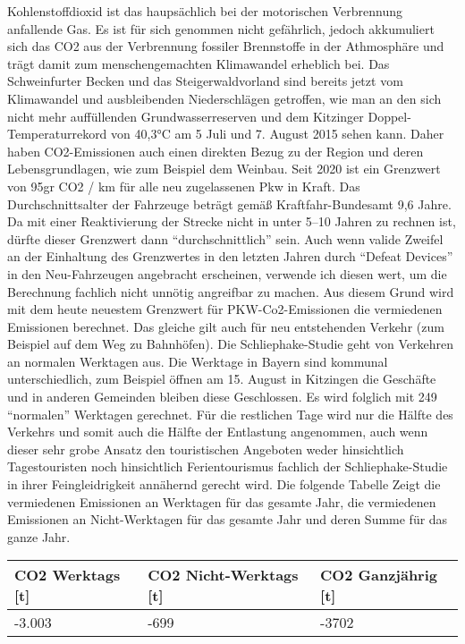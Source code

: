 \documentclass[fontsize=12pt,a4paper]{scrreprt}
\begin{document}
Kohlenstoffdioxid ist das haupsächlich bei der motorischen Verbrennung anfallende Gas. Es ist für sich genommen nicht gefährlich, jedoch akkumuliert sich das CO2 aus der Verbrennung fossiler Brennstoffe in der Athmosphäre und trägt damit zum menschengemachten Klimawandel erheblich bei.
Das Schweinfurter Becken und das Steigerwaldvorland sind bereits jetzt vom Klimawandel und ausbleibenden Niederschlägen getroffen, wie man an den sich nicht mehr auffüllenden Grundwasserreserven und dem Kitzinger Doppel-Temperaturrekord von 40,3°C am 5 Juli und 7. August 2015 sehen kann.
Daher haben CO2-Emissionen auch einen direkten Bezug zu der Region und deren Lebensgrundlagen, wie zum Beispiel dem Weinbau.
\newline
\newline
Seit 2020 ist ein Grenzwert von 95gr CO2 / km für alle neu zugelassenen Pkw in Kraft. Das Durchschnittsalter der Fahrzeuge beträgt gemäß Kraftfahr-Bundesamt 9,6 Jahre. Da mit einer Reaktivierung der Strecke nicht in unter 5--10 Jahren zu rechnen ist, dürfte dieser Grenzwert dann \enquote{durchschnittlich} sein. Auch wenn valide Zweifel an der Einhaltung des Grenzwertes in den letzten Jahren durch \enquote{Defeat Devices} in den Neu-Fahrzeugen angebracht erscheinen, verwende ich diesen wert, um die Berechnung fachlich nicht unnötig angreifbar zu machen.
Aus diesem Grund wird mit dem heute neuestem Grenzwert für PKW-Co2-Emissionen die vermiedenen Emissionen berechnet. Das gleiche gilt auch für neu entstehenden Verkehr (zum Beispiel auf dem Weg zu Bahnhöfen).
\newline
\newline
Die Schliephake-Studie geht von Verkehren an normalen Werktagen aus. Die Werktage in Bayern sind kommunal unterschiedlich, zum Beispiel öffnen am 15. August in Kitzingen die Geschäfte und in anderen Gemeinden bleiben diese Geschlossen. Es wird folglich mit 249 \enquote{normalen} Werktagen gerechnet. Für die restlichen Tage wird nur die Hälfte des Verkehrs und somit auch die Hälfte der Entlastung angenommen, auch wenn dieser sehr grobe Ansatz den touristischen Angeboten weder hinsichtlich Tagestouristen noch hinsichtlich Ferientourismus fachlich der Schliephake-Studie in ihrer Feingleidrigkeit annähernd gerecht wird.
\newline
\newline
Die folgende Tabelle Zeigt die vermiedenen Emissionen an Werktagen für das gesamte Jahr, die vermiedenen Emissionen an Nicht-Werktagen für das gesamte Jahr und deren Summe für das ganze Jahr.
\newline
\newline
\begin{tabular}{|l|l|l|}
\hline
CO2 Werktags [t] & CO2 Nicht-Werktags [t] & CO2 Ganzjährig [t]\\ 
\hline
-3.003 & -699 & -3702\\ 
\hline
\end{tabular}        
\end{document}
